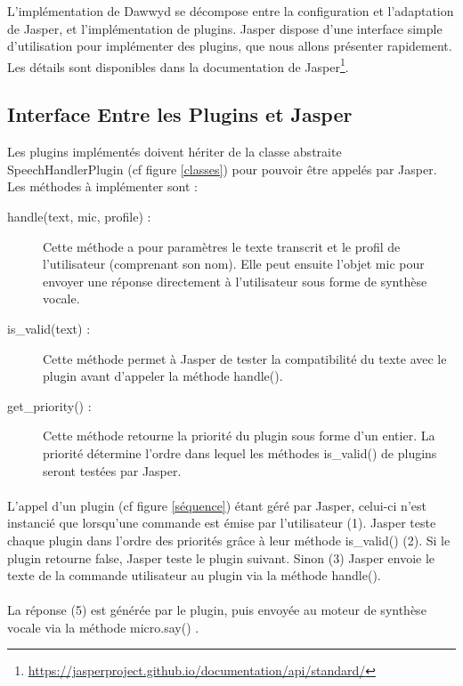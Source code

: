 \documentclass[12pt]{article}
\begin{document}
		L'implémentation de Dawwyd se décompose entre la configuration et l'adaptation de Jasper, et l'implémentation de plugins. Jasper dispose d'une interface simple d'utilisation pour implémenter des plugins, que nous allons présenter rapidement. Les détails sont disponibles dans la documentation de Jasper\footnote{\url{https://jasperproject.github.io/documentation/api/standard/}}.
			
		\subsection{Interface Entre les Plugins et Jasper}
		Les plugins implémentés doivent hériter de la classe abstraite SpeechHandlerPlugin (cf figure \ref{classes}) pour pouvoir être appelés par Jasper. Les méthodes à implémenter sont :
		\begin{description}
			\item[handle(text, mic, profile) : ] Cette méthode a pour paramètres le texte transcrit et le profil de l'utilisateur (comprenant son nom). Elle peut ensuite l'objet mic pour envoyer une réponse directement à l'utilisateur sous forme de synthèse vocale.
			
			\item[is\_valid(text) : ] Cette méthode permet à Jasper de tester la compatibilité du texte avec le plugin avant d'appeler la méthode handle().
			
			\item[get\_priority() : ] Cette méthode retourne la priorité du plugin sous forme d'un entier. La priorité détermine l'ordre dans lequel les méthodes is\_valid() de plugins seront testées par Jasper.
		\end{description}
		
		\paragraph{}
		L'appel d'un plugin (cf figure \ref{séquence}) étant géré par Jasper, celui-ci n'est instancié que lorsqu'une commande est émise par l'utilisateur (1). Jasper teste chaque plugin dans l'ordre des priorités grâce à leur méthode is\_valid() (2). Si le plugin retourne false, Jasper teste le plugin suivant. Sinon (3) Jasper envoie le texte de la commande utilisateur au plugin via la méthode handle().
		
		\paragraph{}
		La réponse (5) est générée par le plugin, puis envoyée au moteur de synthèse vocale via la méthode micro.say() .
		
\end{document}
